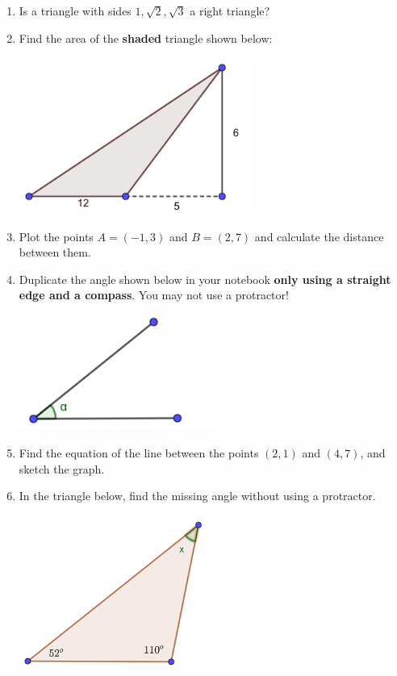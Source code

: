 \documentclass[12pt]{article}
\begin{document}
\begin{enumerate}
\item Is a triangle with sides $1, \sqrt{2}, \sqrt{3}$ a right triangle?

\item Find the area of the \textbf{shaded} triangle shown below:

\includegraphics[width=3in]{area-triangle-1.png}

\item Plot the points $A=(-1, 3)$ and $B=(2, 7)$ and calculate the distance between them.

\item Duplicate the angle shown below in your notebook \textbf{only using a straight edge and a compass}.  You may not use a protractor!

\includegraphics[width=2.5in]{angle-1.png}

\item Find the equation of the line between the points $(2, 1)$ and $(4, 7)$, and sketch the graph.

\pagebreak
\item In the triangle below, find the missing angle without using a protractor.

\includegraphics[width=2.5in]{triangle-solve-angle-1.png}


\end{enumerate}
\end{document}
